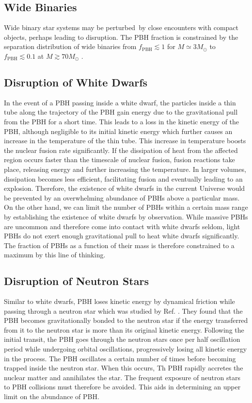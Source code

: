 \subsection{Wide Binaries}
Wide binary star systems may be perturbed by close encounters with compact objects, perhaps leading to disruption. The PBH fraction is constrained by the separation distribution of wide binaries from $f_{\mathrm{PBH}} \lesssim 1$ for $ M \simeq 3M_{\odot}$ to $ f_{\mathrm{PBH}} \lesssim 0.1$ at $M \gtrsim 70 M_{\odot}$ \cite{Monroy_Rodr_guez_2014}.


\subsection{Disruption of White Dwarfs}
In the event of a PBH passing inside a white dwarf, the particles inside a thin tube along the trajectory of the PBH gain energy due to the gravitational pull from the PBH for a short time. This leads to a loss in the kinetic energy of the PBH, although negligible to its initial kinetic energy which further causes an increase in the temperature of the thin tube. This increase in temperature boosts the nuclear fusion rate significantly. If the dissipation of heat from the affected region occurs faster than the timescale of nuclear fusion, fusion reactions take place, releasing energy and further increasing the temperature. In larger volumes, dissipation becomes less efficient, facilitating fusion and eventually leading to an explosion. 
Therefore, the existence of white dwarfs in the current Universe would be prevented by an overwhelming abundance of PBHs above a particular mass. On the other hand, we can limit the number of PBHs within a certain mass range by establishing the existence of white dwarfs by observation. While massive PBHs are uncommon and therefore come into contact with white dwarfs seldom, light PBHs do not exert enough gravitational pull to heat white dwarfs significantly. The fraction of PBHs as a function of their mass is therefore constrained to a maximum by this line of thinking. \cite{Graham:2015apa}


\subsection{Disruption of Neutron Stars}
Similar to white dwarfs, PBH loses kinetic energy by dynamical friction while passing through a neutron star which was studied by Ref. \cite{Capela:2013yf}. They found that the PBH becomes gravitationally bonded to the neutron star if the energy transferred from it to the neutron star is more than its original kinetic energy. Following the initial transit, the PBH goes through the neutron stars once per half oscillation period while undergoing orbital oscillations, progressively losing all kinetic energy in the process. The PBH oscillates a certain number of times before becoming trapped inside the neutron star. When this occurs, Th PBH rapidly accretes the nuclear matter and annihilates the star. The frequent exposure of neutron stars to PBH collisions must therefore be avoided. This aids in determining an upper limit on the abundance of PBH. 

